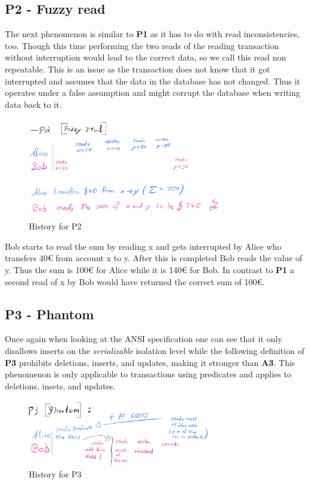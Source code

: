 \documentclass[sigconf, review=false]{acmart}
\begin{document}
\subsection{P2 - Fuzzy read}
The next phenomenon is similar to \textbf{P1} as it has to do with read inconsistencies, too.
Though this time performing the two reads of the reading transaction without interruption would lead
to the correct data, so we call this read non repeatable. This is an issue as the transaction does not know that
it got interrupted and assumes that the data in the database has not changed. Thus it operates under a false assumption
and might corrupt the database when writing data back to it.

\begin{figure}[h]
    \includegraphics[width=8.5cm]{P2}
    \caption{History for P2}
\end{figure}

\begin{example}
    Bob starts to read the sum by reading x and gets interrupted by Alice who transfers 40€ from account x to y.
    After this is completed Bob reads the value of y.
    Thus the sum is 100€ for Alice while it is 140€ for Bob.
    In contrast to \textbf{P1} a second read of x by Bob would have returned the correct sum of 100€.
\end{example}
\subsection{P3 - Phantom}
Once again when looking at the ANSI specification one can see that it only disallows inserts on the \emph{serializable}
isolation level while the following definition of \textbf{P3} prohibits deletions, inserts, and updates, making it stronger than \textbf{A3}.
This phenomenon is only applicable to transactions using predicates and applies to deletions, insets, and updates.

\begin{figure}[h]
    \includegraphics[width=8.5cm]{P3}
    \caption{History for P3}
\end{figure}
\end{document}
